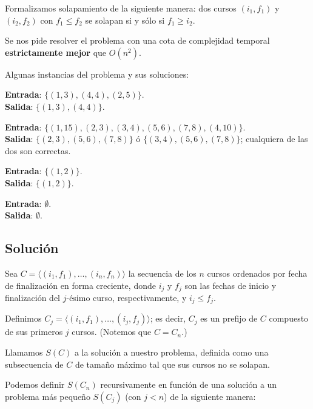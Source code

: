 \documentclass[a4paper,10pt,twoside]{article}
\begin{document}
Formalizamos solapamiento de la siguiente manera: dos cursos $(i_1, f_1)$ y $(i_2, f_2)$ con $f_1 \leq f_2$ se solapan si y sólo si $f_1 \geq i_2$.

Se nos pide resolver el problema con una cota de complejidad temporal \textbf{estrictamente mejor} que $O(n^2)$.

Algunas instancias del problema y sus soluciones:

\textbf{Entrada}: $\{(1, 3), (4, 4), (2, 5)\}$.\\
\textbf{Salida}: $\{(1, 3), (4, 4)\}$.

\textbf{Entrada}: $\{(1, 15), (2, 3), (3, 4), (5, 6), (7, 8), (4, 10)\}$.\\
\textbf{Salida}: $\{(2, 3), (5, 6), (7, 8)\}$ ó $\{(3, 4), (5, 6), (7, 8)\}$; cualquiera de las dos son correctas.

\textbf{Entrada}: $\{(1, 2)\}$.\\
\textbf{Salida}: $\{(1, 2)\}$.

\textbf{Entrada}: $\emptyset$.\\
\textbf{Salida}: $\emptyset$.


\subsection{Solución}

Sea $C = \langle (i_1, f_1), \ldots, (i_n, f_n) \rangle$ la secuencia de los $n$ cursos ordenados por fecha de finalización en forma creciente, donde $i_j$ y $f_j$ son las fechas de inicio y finalización del $j$-ésimo curso, respectivamente, y $i_j \leq f_j$.

Definimos $C_j = \langle (i_1, f_1), \ldots, (i_j, f_j) \rangle$; es decir, $C_j$ es un prefijo de $C$ compuesto de sus primeros $j$ cursos. (Notemos que $C = C_n$.)

Llamamos $S(C)$ a la solución a nuestro problema, definida como una subsecuencia de $C$ de tamaño máximo tal que sus cursos no se solapan.

Podemos definir $S(C_n)$ recursivamente en función de una solución a un problema más pequeño $S(C_j)$ (con $j < n$) de la siguiente manera:
\end{document}
